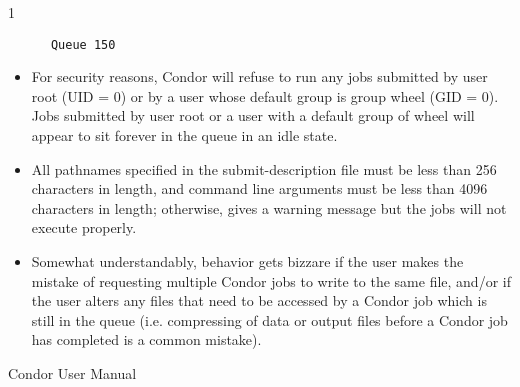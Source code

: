 \begin{ManPage}{\label{man-condor-submit}}{1}
\begin{verbatim}
      Queue 150
\end{verbatim}

\GenRem
\begin{itemize}

\item For security reasons, Condor will refuse to run any jobs submitted
by user root (UID = 0) or by a user whose default group is group wheel
(GID = 0). Jobs submitted by user root or a user with a default group of
wheel will appear to sit forever in the queue in an idle state. 

\item All pathnames specified in the submit-description file must be
less than 256 characters in length, and command line arguments must be
less than 4096 characters in length; otherwise,  gives a
warning message but the jobs will not execute properly. 

\item Somewhat understandably, behavior gets bizzare if the user makes
the mistake of requesting multiple Condor jobs to write to the
same file, and/or if the user alters any files that need to be accessed
by a Condor job which is still in the queue (i.e. compressing of data or
output files before a Condor job has completed is a common mistake).
\end{itemize}

\SeeAlso
Condor User Manual

\end{ManPage}

